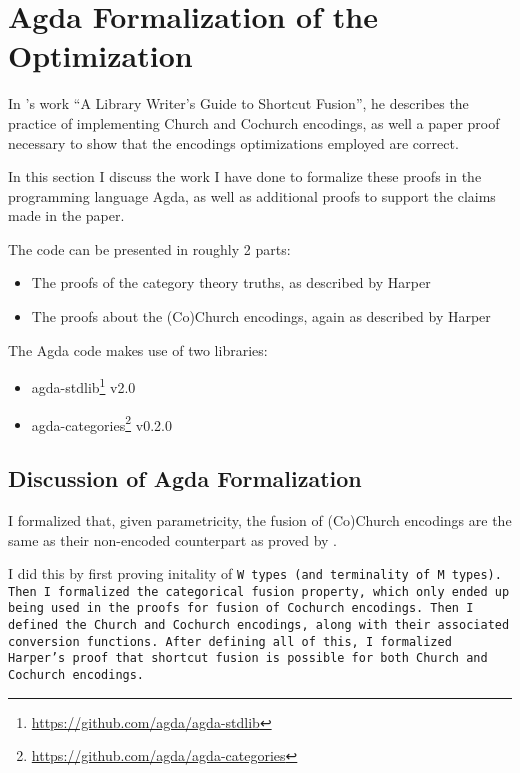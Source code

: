 \section{Agda Formalization of the Optimization}\label{sec:formalization}
In \cite{Harper2011}'s work ``A Library Writer's Guide to Shortcut Fusion'', he describes the practice of implementing Church and Cochurch encodings, as well a paper proof necessary to show that the encodings optimizations employed are correct.

In this section I discuss the work I have done to formalize these proofs in the programming language Agda, as well as additional proofs to support the claims made in the paper.

The code can be presented in roughly 2 parts:
\begin{itemize}
  \item The proofs of the category theory truths, as described by Harper
  \item The proofs about the (Co)Church encodings, again as described by Harper
\end{itemize}

The Agda code makes use of two libraries:
\begin{itemize}[noitemsep]
  \item agda-stdlib\footnote{\url{https://github.com/agda/agda-stdlib}} v2.0
  \item agda-categories\footnote{\url{https://github.com/agda/agda-categories}} v0.2.0
\end{itemize}




\subsection{Discussion of Agda Formalization}
I formalized that, given parametricity, the fusion of (Co)Church encodings are the same as their non-encoded counterpart as proved by \cite{Harper2011}.

I did this by first proving initality of \tt{W} types (and terminality of \tt{M} types).
Then I formalized the categorical fusion property, which only ended up being used in the proofs for fusion of Cochurch encodings.
Then I defined the Church and Cochurch encodings, along with their associated conversion functions.
After defining all of this, I formalized Harper's proof that shortcut fusion is possible for both Church and Cochurch encodings.

